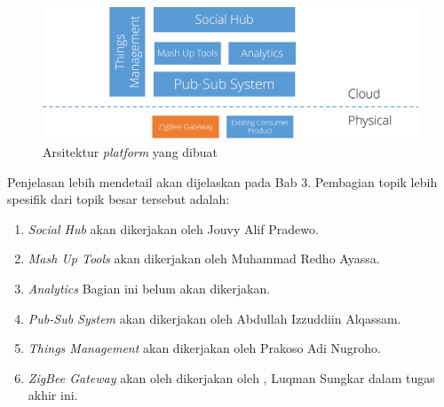 \begin{figure}
	\centering
	\includegraphics[width=.9\textwidth]{pics/rancangan-siot.PNG}
	\caption{Arsitektur \textit{platform} yang dibuat}
	\label{fig:arsitektur-siot}
\end{figure}

Penjelasan lebih mendetail akan dijelaskan pada Bab 3. Pembagian topik lebih spesifik dari topik besar tersebut adalah:
\begin{enumerate}
	\item \textit{Social Hub} akan dikerjakan oleh Jouvy Alif Pradewo.
	\item \textit{Mash Up Tools} akan dikerjakan oleh Muhammad Redho Ayassa.
	\item \textit{Analytics} Bagian ini belum akan dikerjakan.
	\item \textit{Pub-Sub System} akan dikerjakan oleh Abdullah Izzuddiin Alqassam.
	\item \textit{Things Management} akan dikerjakan oleh Prakoso Adi Nugroho.
	\item \textit{ZigBee Gateway} akan oleh dikerjakan oleh \saya, Luqman Sungkar dalam tugas akhir ini.
	
\end{enumerate}

